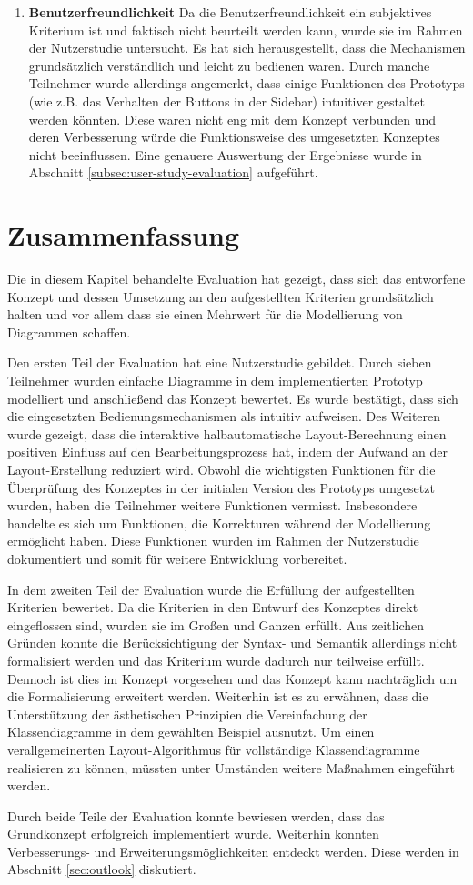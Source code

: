 \begin{enumerate}[label={K.\arabic*}]
\item
\label{eval:user-friendly}
\textbf{Benutzerfreundlichkeit}
Da die Benutzerfreundlichkeit ein subjektives Kriterium ist und faktisch nicht beurteilt werden kann, wurde sie im Rahmen der Nutzerstudie untersucht. Es hat sich herausgestellt, dass die Mechanismen grundsätzlich verständlich und leicht zu bedienen waren. Durch manche Teilnehmer wurde allerdings angemerkt, dass einige Funktionen des Prototyps (wie z.B. das Verhalten der Buttons in der Sidebar) intuitiver gestaltet werden könnten. Diese waren nicht eng mit dem Konzept verbunden und deren Verbesserung würde die Funktionsweise des umgesetzten Konzeptes nicht beeinflussen. Eine genauere Auswertung der Ergebnisse wurde in Abschnitt \ref{subsec:user-study-evaluation} aufgeführt.

\end{enumerate}

\section{Zusammenfassung}
\label{sec:evaluation-summary}

Die in diesem Kapitel behandelte Evaluation hat gezeigt, dass sich das entworfene Konzept und dessen Umsetzung an den aufgestellten Kriterien grundsätzlich halten und vor allem dass sie einen Mehrwert für die Modellierung von Diagrammen schaffen.

Den ersten Teil der Evaluation hat eine Nutzerstudie gebildet. Durch sieben Teilnehmer wurden einfache Diagramme in dem implementierten Prototyp modelliert und anschließend das Konzept bewertet. Es wurde bestätigt, dass sich die eingesetzten Bedienungsmechanismen als intuitiv aufweisen. Des Weiteren wurde gezeigt, dass die interaktive halbautomatische Layout-Berechnung einen positiven Einfluss auf den Bearbeitungsprozess hat, indem der Aufwand an der Layout-Erstellung reduziert wird. Obwohl die wichtigsten Funktionen für die Überprüfung des Konzeptes in der initialen Version des Prototyps umgesetzt wurden, haben die Teilnehmer weitere Funktionen vermisst. Insbesondere handelte es sich um Funktionen, die Korrekturen während der Modellierung ermöglicht haben. Diese Funktionen wurden im Rahmen der Nutzerstudie dokumentiert und somit für weitere Entwicklung vorbereitet.

In dem zweiten Teil der Evaluation wurde die Erfüllung der aufgestellten Kriterien bewertet. Da die Kriterien in den Entwurf des Konzeptes direkt eingeflossen sind, wurden sie im Großen und Ganzen erfüllt. Aus zeitlichen Gründen konnte die Berücksichtigung der Syntax- und Semantik allerdings nicht formalisiert werden und das Kriterium wurde dadurch nur teilweise erfüllt. Dennoch ist dies im Konzept vorgesehen und das Konzept kann nachträglich um die Formalisierung erweitert werden. Weiterhin ist es zu erwähnen, dass die Unterstützung der ästhetischen Prinzipien die Vereinfachung der Klassendiagramme in dem gewählten Beispiel ausnutzt. Um einen verallgemeinerten Layout-Algorithmus für vollständige Klassendiagramme realisieren zu können, müssten unter Umständen weitere Maßnahmen eingeführt werden.

Durch beide Teile der Evaluation konnte bewiesen werden, dass das Grundkonzept erfolgreich implementiert wurde. Weiterhin konnten Verbesserungs- und Erweiterungsmöglichkeiten entdeckt werden. Diese werden in Abschnitt \ref{sec:outlook} diskutiert.
